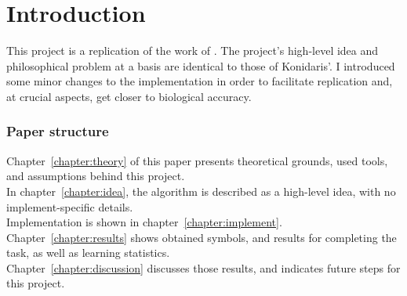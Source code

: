 \section{Introduction}

This project is a replication of the work of \textcite{konidaris2018skills}. The project's high-level idea and philosophical problem at a basis are identical to those of Konidaris'. I introduced some minor changes to the implementation in order to facilitate replication and, at crucial aspects, get closer to biological accuracy. 


\subsubsection*{Paper structure} 
Chapter~\ref{chapter:theory} of this paper presents theoretical grounds, used tools, and assumptions behind this project. \\
In chapter~\ref{chapter:idea}, the algorithm is described as a high-level idea, with no implement-specific details. \\
Implementation is shown in chapter~\ref{chapter:implement}.\\
Chapter~\ref{chapter:results} shows obtained symbols, and results for completing the task, as well as learning statistics. \\
Chapter~\ref{chapter:discussion} discusses those results, and indicates future steps for this project. 
